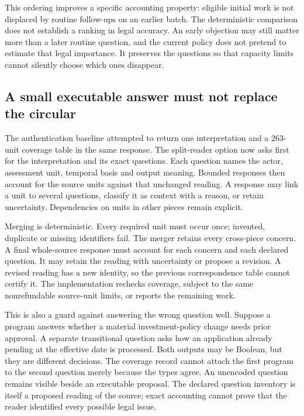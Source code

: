 \documentclass[12pt,a4paper,oneside,openany]{book}
\begin{document}
This ordering improves a specific accounting property: eligible initial work
is not displaced by routine follow-ups on an earlier batch. The deterministic
comparison does not establish a ranking in legal accuracy. An early objection
may still matter more than a later routine question, and the current policy does
not pretend to estimate that legal importance. It preserves the questions so
that capacity limits cannot silently choose which ones disappear.

\subsection{A small executable answer must not replace the circular}

The authentication baseline attempted to return one interpretation and a
263-unit coverage table in the same response. The split-reader option now asks
first for the interpretation and its exact questions. Each question names the
actor, assessment unit, temporal basis and output meaning. Bounded responses
then account for the source units against that unchanged reading. A response
may link a unit to several questions, classify it as context with a reason, or
retain uncertainty. Dependencies on units in other pieces remain explicit.

Merging is deterministic. Every required unit must occur once; invented,
duplicate or missing identifiers fail. The merger retains every cross-piece
concern. A final whole-source response must account for each concern and each
declared question. It may retain the reading with uncertainty or propose a
revision. A revised reading has a new identity, so the previous correspondence
table cannot certify it. The implementation rechecks coverage, subject to the
same nonrefundable source-unit limits, or reports the remaining work.

This is also a guard against answering the wrong question well. Suppose a
program answers whether a material investment-policy change needs prior
approval. A separate transitional question asks how an application already
pending at the effective date is processed. Both outputs may be Boolean, but
they are different decisions. The coverage record cannot attach the first
program to the second question merely because the types agree. An unencoded
question remains visible beside an executable proposal. The declared question
inventory is itself a proposed reading of the source; exact accounting cannot
prove that the reader identified every possible legal issue.
\end{document}
